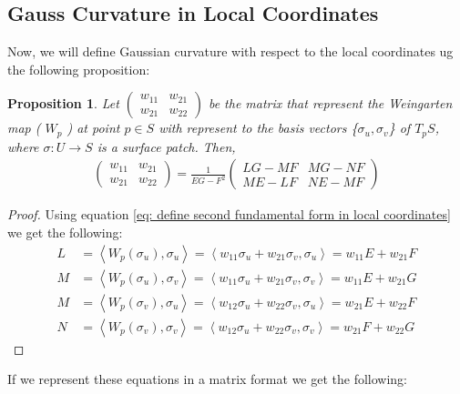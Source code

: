 \documentclass{article}
\theoremstyle{plain}
\newtheorem{proposition}{Proposition}
\theoremstyle{definition}
\theoremstyle{remark}
\begin{document}
\subsection{Gauss Curvature in Local Coordinates}
Now, we will define Gaussian curvature with respect to the local coordinates ug the following proposition:
\begin{proposition}
    Let \( \begin{pmatrix}
        w_{11} & w_{21} \\
        w_{21} & w_{22} 
    \end{pmatrix}\)
    be the matrix that represent the Weingarten map ( \(W_p\) ) at point \( p \in S\) with represent to the basis vectors \{\( \sigma_u, \sigma_v \)\} of \( T_pS \), where \( \sigma: U \rightarrow S\) is a surface patch. Then, 
    \begin{align} \label{eq: Weingarten map local coordinates}
        \begin{pmatrix}
            w_{11} & w_{21} \\
            w_{21} & w_{22} 
        \end{pmatrix} = \frac{1}{EG-F^2} \begin{pmatrix}
            LG - MF & MG - NF \\
            ME - LF & NE- MF
        \end{pmatrix}
    \end{align}
\end{proposition}
\begin{proof}
    Using equation \ref{eq: define second fundamental form in local coordinates} we get the following:
    \begin{align*}
        L & = \left\langle W_p(\sigma_u), \sigma_u \right\rangle = \left\langle w_{11}\sigma_u + w_{21}\sigma_v, \sigma_u\right\rangle = w_{11}E + w_{21}F \\
        M & = \left\langle W_p(\sigma_u), \sigma_v \right\rangle =  \left\langle w_{11}\sigma_u + w_{21}\sigma_v, \sigma_v\right\rangle = w_{11}E + w_{21}G  \\
        M & = \left\langle W_p(\sigma_v), \sigma_u \right\rangle = \left\langle w_{12}\sigma_u + w_{22}\sigma_v, \sigma_u\right\rangle = w_{21}E + w_{22}F  \\
        N & = \left\langle W_p(\sigma_v), \sigma_v \right\rangle = \left\langle w_{12}\sigma_u + w_{22}\sigma_v, \sigma_v\right\rangle = w_{21}F + w_{22}G  
    \end{align*}
\end{proof}
If we represent these equations in a matrix format we get the following: 
\end{document}
